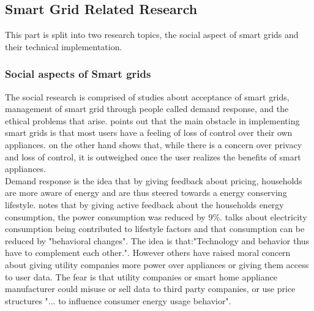 \documentclass[a4paper]{article}
\begin{document}
\subsection{Smart Grid Related Research}
This part is split into two research topics, the social aspect of smart grids and their technical implementation.\\ 
\subsubsection{Social aspects of Smart grids}
The social research is comprised of studies about acceptance of smart grids, management of smart grid through people called demand response, and the ethical problems that arise.
\cite{disgust1} points out that the main obstacle in implementing smart grids is that most users have a feeling of loss of control over their own appliances.\cite{disgust3} on the other hand shows that, while there is a concern over privacy and loss of control, it is outweighed once the user realizes the benefits of smart appliances.\\
Demand response is the idea that by giving feedback about pricing, households are more aware of energy and are thus steered towards a energy conserving lifestyle.\cite{disgust1} notes that by giving active feedback about the households energy consumption, the power consumption was reduced by 9\%. \cite{disgust2} talks about electricity consumption being contributed to lifestyle factors and that consumption can be reduced by "behavioral changes". The idea is that:"Technology and behavior thus have to complement each other."\cite{disgust2}. However others have raised moral concern about giving utility companies more power over appliances or giving them access to user data\cite{ethics1}\cite{ethics2}. The fear is that utility companies or smart home appliance manufacturer could misuse or sell data to third party companies, or use price structures "... to influence consumer energy usage behavior"\cite{ethics1}.  \\

\end{document}
